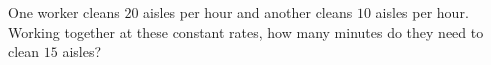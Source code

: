 One worker cleans $20$ aisles per hour and another cleans $10$ aisles per hour. Working together at these constant rates, how many minutes do they need to clean $15$ aisles?

